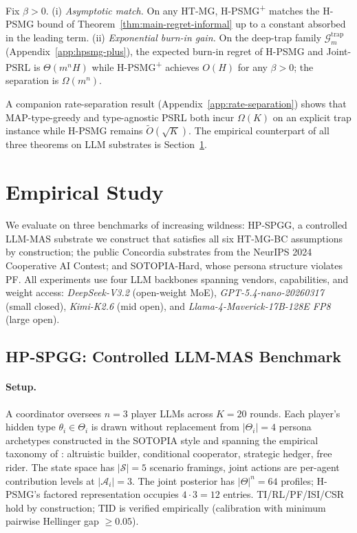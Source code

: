 \begin{theorem}\label{thm:hpsmg-plus}
Fix $\beta>0$. (i) \emph{Asymptotic match.} On any HT-MG, H-PSMG\textsuperscript{+} matches the H-PSMG bound of Theorem~\ref{thm:main-regret-informal} up to a constant absorbed in the leading term. (ii) \emph{Exponential burn-in gain.} On the deep-trap family $\mathcal G_m^{\mathrm{trap}}$ (Appendix~\ref{app:hpsmg-plus}), the expected burn-in regret of H-PSMG and Joint-PSRL is $\Theta(m^n H)$ while H-PSMG\textsuperscript{+} achieves $O(H)$ for any $\beta>0$; the separation is $\Omega(m^n)$.
\end{theorem}

A companion rate-separation result (Appendix~\ref{app:rate-separation}) shows that MAP-type-greedy and type-agnostic PSRL both incur $\Omega(K)$ on an explicit trap instance while H-PSMG remains $\tilde O(\sqrt K)$. The empirical counterpart of all three theorems on LLM substrates is Section~\ref{sec:experiments-llm}.

\section{Empirical Study}
\label{sec:experiments-llm}

We evaluate on three benchmarks of increasing wildness: HP-SPGG, a controlled LLM-MAS substrate we construct that satisfies all six HT-MG-BC assumptions by construction; the public Concordia substrates from the NeurIPS 2024 Cooperative AI Contest; and SOTOPIA-Hard, whose persona structure violates PF. All experiments use four LLM backbones spanning vendors, capabilities, and weight access: \emph{DeepSeek-V3.2} (open-weight MoE), \emph{GPT-5.4-nano-20260317} (small closed), \emph{Kimi-K2.6} (mid open), and \emph{Llama-4-Maverick-17B-128E FP8} (large open).

\subsection{HP-SPGG: Controlled LLM-MAS Benchmark}
\label{sec:hp-spgg}

\paragraph{Setup.} A coordinator oversees $n{=}3$ player LLMs across $K{=}20$ rounds. Each player's hidden type $\theta_i\!\in\!\Theta_i$ is drawn without replacement from $|\Theta_i|{=}4$ persona archetypes constructed in the SOTOPIA style \citep{zhou2024sotopia} and spanning the empirical taxonomy of \citet{fischbacher2001people}: altruistic builder, conditional cooperator, strategic hedger, free rider. The state space has $|\mathcal S|{=}5$ scenario framings, joint actions are per-agent contribution levels at $|\mathcal A_i|{=}3$. The joint posterior has $|\Theta|^n{=}64$ profiles; H-PSMG's factored representation occupies $4\cdot 3{=}12$ entries. TI/RL/PF/ISI/CSR hold by construction; TID is verified empirically (calibration with minimum pairwise Hellinger gap $\geq 0.05$).

